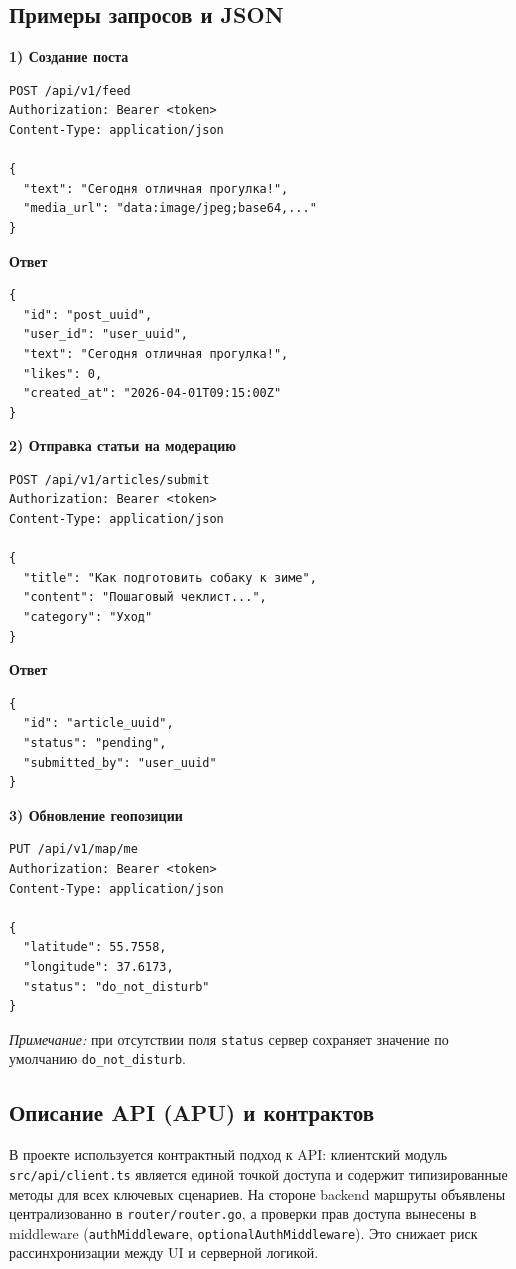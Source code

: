 \documentclass[12pt,a4paper]{article}
\newcommand{\code}[1]{{\small\texttt{#1}}}
\begin{document}
\subsection{Примеры запросов и JSON}

\textbf{1) Создание поста}
\begin{verbatim}
POST /api/v1/feed
Authorization: Bearer <token>
Content-Type: application/json

{
  "text": "Сегодня отличная прогулка!",
  "media_url": "data:image/jpeg;base64,..."
}
\end{verbatim}

\textbf{Ответ}
\begin{verbatim}
{
  "id": "post_uuid",
  "user_id": "user_uuid",
  "text": "Сегодня отличная прогулка!",
  "likes": 0,
  "created_at": "2026-04-01T09:15:00Z"
}
\end{verbatim}

\textbf{2) Отправка статьи на модерацию}
\begin{verbatim}
POST /api/v1/articles/submit
Authorization: Bearer <token>
Content-Type: application/json

{
  "title": "Как подготовить собаку к зиме",
  "content": "Пошаговый чеклист...",
  "category": "Уход"
}
\end{verbatim}

\textbf{Ответ}
\begin{verbatim}
{
  "id": "article_uuid",
  "status": "pending",
  "submitted_by": "user_uuid"
}
\end{verbatim}

\textbf{3) Обновление геопозиции}
\begin{verbatim}
PUT /api/v1/map/me
Authorization: Bearer <token>
Content-Type: application/json

{
  "latitude": 55.7558,
  "longitude": 37.6173,
  "status": "do_not_disturb"
}
\end{verbatim}

\noindent\textit{Примечание:} при отсутствии поля \code{status} сервер сохраняет значение по умолчанию \code{do\_not\_disturb}.

\subsection{Описание API (APU) и контрактов}

В проекте используется контрактный подход к API: клиентский модуль \code{src/api/client.ts} является единой точкой доступа и содержит типизированные методы для всех ключевых сценариев. На стороне backend маршруты объявлены централизованно в \code{router/router.go}, а проверки прав доступа вынесены в middleware (\code{authMiddleware}, \code{optionalAuthMiddleware}). Это снижает риск рассинхронизации между UI и серверной логикой.
\end{document}

